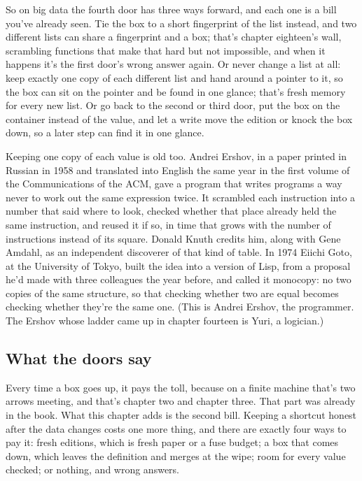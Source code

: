 \documentclass[11pt,twoside]{article}
\theoremstyle{thielethm}
\theoremstyle{thieledef}
\theoremstyle{thieledef}
\theoremstyle{thieledef}
\theoremstyle{thielethm}
\theoremstyle{thieleobs}
\theoremstyle{thielethm}
\begin{document}
So on big data the fourth door has three ways forward, and each one is a bill you've already seen. Tie the box to a short fingerprint of the list instead, and two different lists can share a fingerprint and a box; that's chapter eighteen's wall, scrambling functions that make that hard but not impossible, and when it happens it's the first door's wrong answer again. Or never change a list at all: keep exactly one copy of each different list and hand around a pointer to it, so the box can sit on the pointer and be found in one glance; that's fresh memory for every new list. Or go back to the second or third door, put the box on the container instead of the value, and let a write move the edition or knock the box down, so a later step can find it in one glance.

Keeping one copy of each value is old too. Andrei Ershov, in a paper printed in Russian in 1958 and translated into English the same year in the first volume of the Communications of the ACM, gave a program that writes programs a way never to work out the same expression twice. It scrambled each instruction into a number that said where to look, checked whether that place already held the same instruction, and reused it if so, in time that grows with the number of instructions instead of its square. Donald Knuth credits him, along with Gene Amdahl, as an independent discoverer of that kind of table. In 1974 Eiichi Goto, at the University of Tokyo, built the idea into a version of Lisp, from a proposal he'd made with three colleagues the year before, and called it monocopy: no two copies of the same structure, so that checking whether two are equal becomes checking whether they're the same one. (This is Andrei Ershov, the programmer. The Ershov whose ladder came up in chapter fourteen is Yuri, a logician.)

\subsection{What the doors say}

Every time a box goes up, it pays the toll, because on a finite machine that's two arrows meeting, and that's chapter two and chapter three. That part was already in the book. What this chapter adds is the second bill. Keeping a shortcut honest after the data changes costs one more thing, and there are exactly four ways to pay it: fresh editions, which is fresh paper or a fuse budget; a box that comes down, which leaves the definition and merges at the wipe; room for every value checked; or nothing, and wrong answers.
\end{document}
